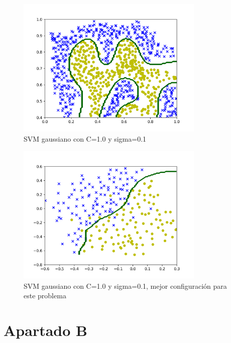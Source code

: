 \documentclass[6pt]{../../shared/AiTex}
\begin{document}
\begin{figure}[H]
    \centering
    \includegraphics[width=0.8\textwidth]{./images/SVM_gauss_c1.0_sigma0.1.png}
    \caption{SVM gaussiano con C=1.0 y sigma=0.1}
\end{figure}

\begin{figure}[H]
    \centering
    \includegraphics[width=0.8\textwidth]{./images/SVM_gauss_best.png}
    \caption{SVM gaussiano con C=1.0 y sigma=0.1, mejor configuración  para este problema}
\end{figure}

\section{Apartado B}
\end{document}
